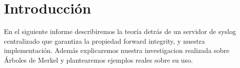 \section{Introducción}

En el siguiente informe describiremos la teoría detrás de un servidor de syslog centralizado que
garantiza la propiedad forward integrity, y nuestra implementación. Además explicaremos nuestra investigacion realizada sobre Árboles
de Merkel y plantearemos ejemplos reales sobre su uso.
